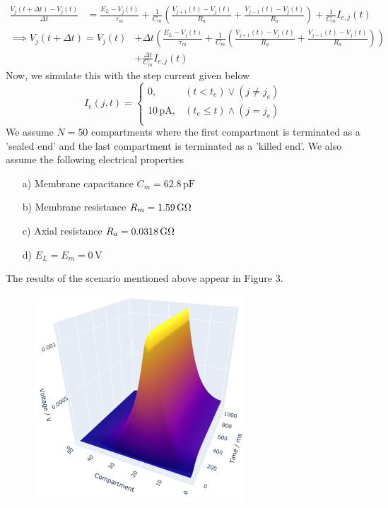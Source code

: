 \documentclass[12pt]{article}
\begin{document}
\begin{enumerate}
    \begin{align*}
        \frac{V_{j}(t + \Delta t) - V_{j}(t)}{\Delta t} &= \frac{E_{L} - V_{j}(t)}{\tau_{m}} + \frac{1}{C_{m}}\left(\frac{V_{j+1}(t) - V_{j}(t)}{R_{a}} + \frac{V_{j-1}(t) - V_{j}(t)}{R_{a}}\right) + \frac{1}{C_{m}}I_{e, j}(t)
    \end{align*}
    \begin{align*}
        \implies V_{j}(t + \Delta t) = V_{j}(t) &+ \Delta t \left( \frac{E_{L} - V_{j}(t)}{\tau_{m}} + \frac{1}{C_{m}} \left( \frac{V_{j+1}(t) - V_{j}(t)}{R_{a}} + \frac{V_{j-1}(t) - V_{j}(t)}{R_{a}}\right) \right)\\
        &+ \frac{\Delta t}{C_{m}}I_{e, j}(t)
    \end{align*}
    Now, we simulate this with the step current given below 
    \[
    I_{e}(j, t)= 
    \begin{cases}
        0, & (t < t_{e}) \vee (j \neq j_{e})\\
        10 \, \text{pA} ,              & (t_{e} \leqslant t) \wedge (j = j_{e})\\
    \end{cases}
    \]
    We assume $N = 50$ compartments where the first compartment is terminated as a 'sealed end' 
    and the last compartment is terminated as a 'killed end'. We also assume the following electrical properties
    \begin{enumerate}
        \item[a)] Membrane capacitance $C_{m} = 62.8 \, \text{pF}$
        \item[b)] Membrane resistance $R_{m} = 1.59 \, \text{G\si{\ohm}}$
        \item[c)] Axial resistance $R_{a} = 0.0318 \, \text{G\si{\ohm}}$
        \item[d)] $E_{L} = E_{m} = 0 \, \text{V}$
    \end{enumerate}
    The results of the scenario mentioned above appear in Figure 3.
    \begin{figure}[h]
        \centering
        \includegraphics[width=0.7\textwidth]{Figures/fig1_3d.png}

\end{figure}
\end{enumerate}
\end{document}
